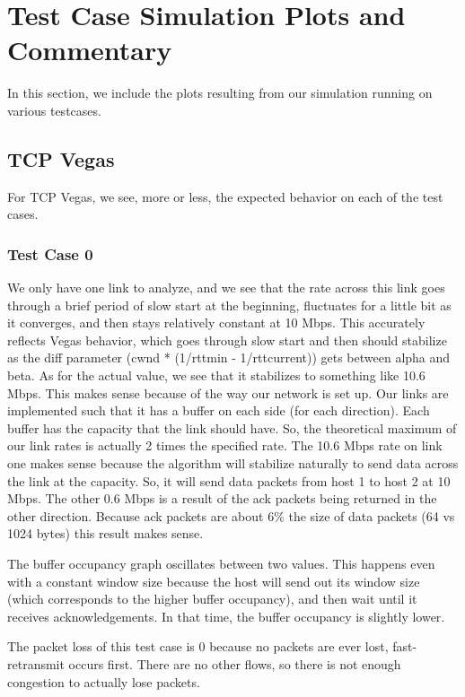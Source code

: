 

\newpage
\section{Test Case Simulation Plots and Commentary}
In this section, we include the plots resulting from our simulation running
on various testcases. 

\subsection{TCP Vegas}
For TCP Vegas, we see, more or less, the expected behavior on each of the test
cases.

\subsubsection{Test Case 0}
We only have one link to analyze, and we see that
the rate across this link goes through a brief period of slow start at the
beginning, fluctuates for a little bit as it converges, and then
stays relatively constant at 10 Mbps. This accurately reflects
Vegas behavior, which goes through slow start and then should stabilize as the
diff parameter (cwnd * (1/rttmin - 1/rttcurrent)) gets between alpha and beta.
As for the actual value, we see that it stabilizes to something like 10.6 Mbps.
This makes sense because of the way our network is set up. Our links are
implemented such that it has a buffer on each side (for each direction). Each
buffer has the capacity that the link should have. So, the theoretical maximum
of our link rates is actually 2 times the specified rate. The 10.6 Mbps rate
on link one makes sense because the algorithm will stabilize naturally to send
data across the link at the capacity. So, it will send data packets from 
host 1 to host 2 at 10 Mbps. The other 0.6 Mbps is a result of the ack packets
being returned in the other direction. Because ack packets are about 6\%
the size of data packets (64 vs 1024 bytes) this result makes sense.

The buffer occupancy graph oscillates between two values. This happens even
with a constant window size because the host will send out its window size
(which corresponds to the higher buffer occupancy), and then wait until it
receives acknowledgements. In that time, the buffer occupancy is slightly lower.

The packet loss of this test case is 0 because no packets are ever lost,
fast-retransmit occurs first. There are no other flows, so there is not enough
congestion to actually lose packets.

